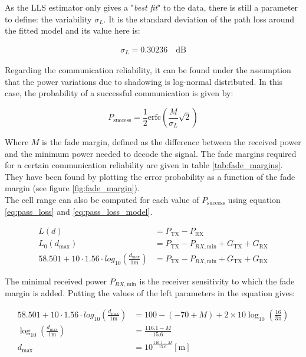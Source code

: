 \documentclass[10pt,a4paper]{ULBreport}
\begin{document}
As the LLS estimator only gives a "\textit{best fit}" to the data, there is still a parameter to define: the variability $\sigma_L$. It is the standard deviation of the path loss around the fitted model and its value here is:

\begin{align*}
    \sigma_L = 0.30236 \quad \text{dB}
\end{align*}

Regarding the communication reliability, it can be found under the assumption that the power variations due to shadowing is log-normal distributed. In this case, the probability of a successful communication is given by:

\begin{equation}
    \label{eq:pass_loss_probability}
    P_{\text{success}} = \frac{1}{2} \text{erfc}\left(\frac{M}{\sigma_L}\sqrt{2}\right) 
\end{equation}

Where $M$ is the fade margin, defined as the difference between the received power and the minimum power needed to decode the signal. The fade margins required for a certain communication reliability are given in table \ref{tab:fade_margins}. They have been found by plotting the error probability as a function of the fade margin (see figure \ref{fig:fade_margin}). \\
The cell range can also be computed for each value of $P_{\text{success}}$ using equation \ref{eq:pass_loss} and \ref{eq:pass_loss_model}. 

\begin{align*}
    L(d) &= P_{\text{TX}} - P_{\text{RX}}\\
    L_0(d_\text{max}) &= P_{\text{TX}} - P_{RX, \text{min}} + G_{\text{TX}} + G_{\text{RX}}\\
    58.501 + 10 \cdot 1.56 \cdot log_{10} \left(\frac{d_{\text{max}}}{1\text{m}}\right) &= P_{\text{TX}} - P_{RX, \text{min}} + G_{\text{TX}} + G_{\text{RX}}
\end{align*}

The minimal received power $P_{RX, \text{min}}$ is the receiver sensitivity to which the fade margin is added. Putting the values of the left parameters in the equation gives:

\begin{align*}
    58.501 + 10 \cdot 1.56 \cdot log_{10} \left(\frac{d_{\text{max}}}{1\text{m}}\right) &= 100 - (-70 + M) + 2 \times 10 \log_{10} \left(\frac{16}{3\pi}\right)\\
    \log_{10} \left(\frac{d_{\text{max}}}{1\text{m}}\right) &= \frac{116.1 - M}{15.6}\\
    d_{\text{max}} &= 10^{\frac{116.1 - M}{15.6}} \left[\text{m}\right]
\end{align*}
\end{document}
